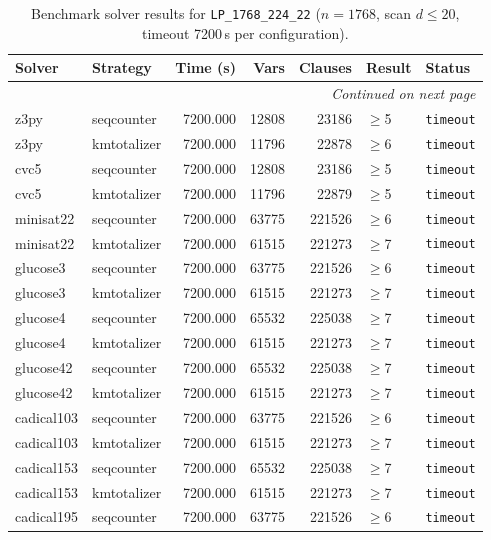 \begin{longtable}{llrrrl p{}}
\caption{Benchmark solver results for \texttt{LP\_1768\_224\_22} ($n=1768$, scan $d \leq 20$, timeout 7200\,s per configuration).} \label{tab:bench-LP_1768_224_22} \\
\toprule
Solver & Strategy & Time (s) & Vars & Clauses & Result & Status \\
\midrule
\endhead
\midrule
\multicolumn{7}{r}{\textit{Continued on next page}} \\
\midrule
\endfoot
\bottomrule
\endlastfoot
z3py & seqcounter & 7200.000 & 12808 & 23186 & $\geq$5 & \texttt{timeout} \\
z3py & kmtotalizer & 7200.000 & 11796 & 22878 & $\geq$6 & \texttt{timeout} \\
cvc5 & seqcounter & 7200.000 & 12808 & 23186 & $\geq$5 & \texttt{timeout} \\
cvc5 & kmtotalizer & 7200.000 & 11796 & 22879 & $\geq$5 & \texttt{timeout} \\
minisat22 & seqcounter & 7200.000 & 63775 & 221526 & $\geq$6 & \texttt{timeout} \\
minisat22 & kmtotalizer & 7200.000 & 61515 & 221273 & $\geq$7 & \texttt{timeout} \\
glucose3 & seqcounter & 7200.000 & 63775 & 221526 & $\geq$6 & \texttt{timeout} \\
glucose3 & kmtotalizer & 7200.000 & 61515 & 221273 & $\geq$7 & \texttt{timeout} \\
glucose4 & seqcounter & 7200.000 & 65532 & 225038 & $\geq$7 & \texttt{timeout} \\
glucose4 & kmtotalizer & 7200.000 & 61515 & 221273 & $\geq$7 & \texttt{timeout} \\
glucose42 & seqcounter & 7200.000 & 65532 & 225038 & $\geq$7 & \texttt{timeout} \\
glucose42 & kmtotalizer & 7200.000 & 61515 & 221273 & $\geq$7 & \texttt{timeout} \\
cadical103 & seqcounter & 7200.000 & 63775 & 221526 & $\geq$6 & \texttt{timeout} \\
cadical103 & kmtotalizer & 7200.000 & 61515 & 221273 & $\geq$7 & \texttt{timeout} \\
cadical153 & seqcounter & 7200.000 & 65532 & 225038 & $\geq$7 & \texttt{timeout} \\
cadical153 & kmtotalizer & 7200.000 & 61515 & 221273 & $\geq$7 & \texttt{timeout} \\
cadical195 & seqcounter & 7200.000 & 63775 & 221526 & $\geq$6 & \texttt{timeout} \\

\end{longtable}

